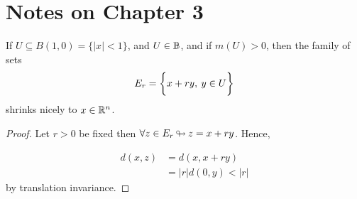 \documentclass[../../main.tex]{subfiles}
\begin{document}
\section*{Notes on Chapter 3}
\begin{wts}
    If $U\subseteq B(1,0)=\{|x|<1\}$, and $U\in{\mathbb{B}}$, and if $m(U)>0$, then the family of sets 
    \[
    E_r = \biggl\{{x+ry,\:y\in U}\biggr\}
    \]
    shrinks nicely to $x\in{\mathbb{R}^n}$.
\end{wts}
\begin{proof}
    Let $r>0$ be fixed then $\forall z\in E_r{\:\looparrowright\:} z = x+ry$. Hence,
    
    \begin{align*}
        d(x,z) &= d(x, x + ry)\\
                &= |r|d(0,y)<|r|
    \end{align*}
    by translation invariance.
\end{proof}
\end{document}
